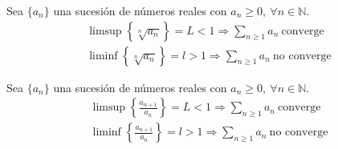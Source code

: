 \begin{ejercicio}
    Sea $\{a_n\}$ una sucesión de números reales con $a_n \geq 0, ~ \forall n \in \mathbb{N}$.
    \begin{gather*}
        \limsup \left\{ \sqrt[n]{a_n} \right\} = L < 1 \Longrightarrow \displaystyle\sum_{n \geq 1} a_n ~ \text{converge}\\
        \liminf \left\{ \sqrt[n]{a_n} \right\} = l > 1 \Longrightarrow \displaystyle\sum_{n \geq 1} a_n ~ \text{no converge}
    \end{gather*}
\end{ejercicio}

\begin{ejercicio}
    Sea $\{a_n\}$ una sucesión de números reales con $a_n \geq 0, ~ \forall n \in \mathbb{N}$.
    \begin{gather*}
        \limsup \left\{ \frac{a_{n+1}}{a_n} \right\} = L < 1 \Longrightarrow \displaystyle\sum_{n \geq 1} a_n ~ \text{converge}\\
        \liminf \left\{ \frac{a_{n+1}}{a_n} \right\} = l > 1 \Longrightarrow \displaystyle\sum_{n \geq 1} a_n ~ \text{no converge}
    \end{gather*}
\end{ejercicio}